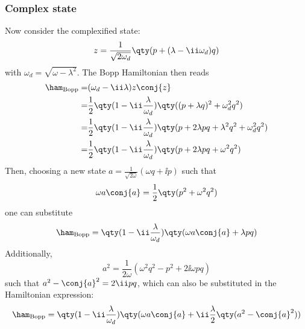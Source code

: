 \subsubsection{Complex state}
Now consider the complexified state:
$$ z = \frac{1}{\sqrt{2\omega_d}} \qty(p + (\lambda - \ii\omega_d)q) $$
with $\omega_d = \sqrt{\omega - \lambda^2}$. The Bopp Hamiltonian then reads
\begin{equation} 
    \begin{split}
    \ham_\text{Bopp} = & (\omega_d - \ii\lambda)z\conj{z} \\
                     = & \frac{1}{2}\qty(1 - \ii\frac{\lambda}{\omega_d})\qty((p + \lambda q)^2 + \omega_d^2q^2)\\
                     = & \frac{1}{2}\qty(1 - \ii\frac{\lambda}{\omega_d})\qty(p + 2\lambda pq + \lambda^2q^2 + \omega_d^2q^2)\\
                     = & \frac{1}{2}\qty(1 - \ii\frac{\lambda}{\omega_d})\qty(p + 2\lambda pq + \omega^2q^2)
    \end{split}
\end{equation}
Then, choosing a new state $a = \frac{1}{\sqrt{2\omega}}(\omega q + \ii p)$ such that 
$$ \omega a \conj{a} = \frac{1}{2}\qty(p^2 + \omega^2q^2) $$
one can substitute
\begin{equation}
    \ham_\text{Bopp} = \qty(1 - \ii\frac{\lambda}{\omega_d})\qty(\omega a \conj{a} + \lambda pq)
\end{equation}
Additionally,
$$
    a^2 = \frac{1}{2\omega}(\omega^2 q^2 - p^2 + 2\ii\omega p q )
$$
such that $ a^2 - \conj{a}^2 = 2\ii p q$, which can also be substituted in the Hamiltonian expression:
\begin{equation}
    \ham_\text{Bopp} = \qty(1 - \ii\frac{\lambda}{\omega_d})\qty(\omega a \conj{a} + \ii \frac{\lambda}{2} \qty(a^2 - \conj{a}^2) )
\end{equation}


